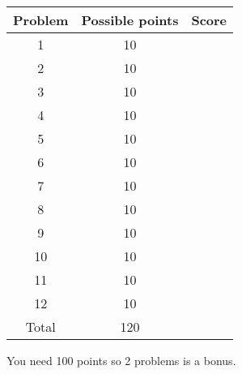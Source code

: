 \documentclass[12pt,leqno]{amsart}
\theoremstyle{definition}
\begin{document}
\renewcommand{\thepage}{}




\vspace{1cm}

{\LARGE
	\begin{center}
		\begin{tabular}{|c|c|c|} \hline
			Problem & Possible points & Score \\
			\hline 1       &        10    &      \\
			\hline 2       &        10    &      \\
			\hline 3       &        10    &      \\
			\hline 4       &        10    &      \\
			\hline 5       &        10    &      \\
			\hline 6       &        10    &      \\
			\hline 7       &        10    &      \\
			\hline 8       &        10    &      \\
			\hline 9       &        10    &      \\
			\hline 10      &        10    &      \\
			\hline 11      &        10    &      \\
			\hline 12      &        10    &      \\
			\hline Total   &        120      &    \\
			\hline
		\end{tabular}
	\end{center}
}
\bigskip

You need 100 points so 2 problems is a bonus.
\end{document}
